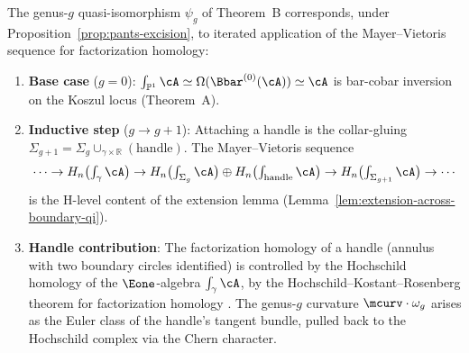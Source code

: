 \begin{proposition}
\label{prop:genus-induction-excision}
The genus-$g$ quasi-isomorphism $\psi_g$ of
Theorem~\textup{B} corresponds, under
Proposition~\textup{\ref{prop:pants-excision}}, to iterated
application of the Mayer--Vietoris sequence for factorization
homology:
\begin{enumerate}[label=(\roman*)]
\item \textbf{Base case} ($g = 0$):
$\int_{\mathbb{P}^1}\cA \simeq \Omega(\Bbar^{(0)}(\cA))
\simeq \cA$ is bar-cobar inversion on the Koszul locus
(Theorem~\textup{A}).

\item \textbf{Inductive step} ($g \to g+1$):
Attaching a handle is the collar-gluing
$\Sigma_{g+1} = \Sigma_g \cup_{\gamma \times \mathbb{R}}
(\text{handle})$.  The Mayer--Vietoris sequence
\[
\cdots \to
H_n\bigl(\textstyle\int_\gamma\cA\bigr) \to
H_n\bigl(\textstyle\int_{\Sigma_g}\cA\bigr) \oplus
H_n\bigl(\textstyle\int_{\mathrm{handle}}\cA\bigr) \to
H_n\bigl(\textstyle\int_{\Sigma_{g+1}}\cA\bigr)
\to \cdots
\]
is the H-level content of the extension lemma
(Lemma~\textup{\ref{lem:extension-across-boundary-qi}}).

\item \textbf{Handle contribution}: The factorization homology
of a handle (annulus with two boundary circles identified) is
controlled by the Hochschild homology of the $\Eone$-algebra
$\int_\gamma\cA$, by the Hochschild--Kostant--Rosenberg
theorem for factorization homology
\cite[Theorem~5.5.3.10]{HA}.
The genus-$g$ curvature
$\mcurv \cdot \omega_g$ arises as the Euler class of the handle's
tangent bundle, pulled back to the Hochschild complex
via the Chern character.
\end{enumerate}
\end{proposition}

